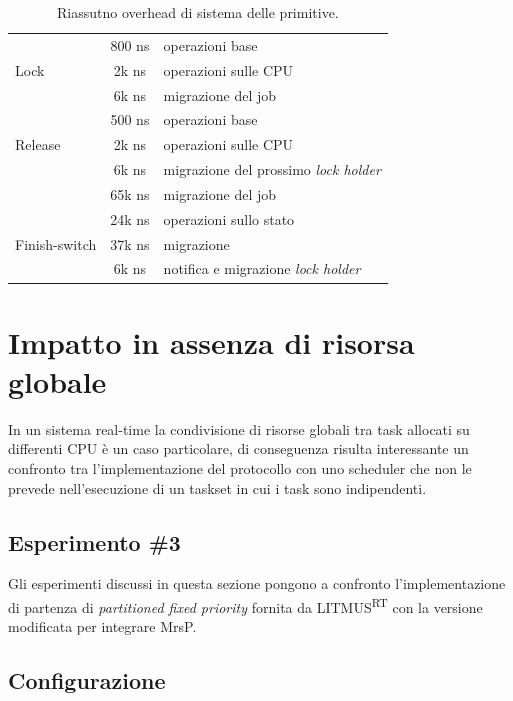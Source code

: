 \begin{table}
  \centering
\begin{tabular}{|l|c|l|}
  \hline
    & 800 ns & operazioni base\\ \cline{2-3}
  Lock & 2k ns & operazioni sulle CPU\\ \cline{2-3}
    & 6k ns & migrazione del job\\
  \hline\hline
    & 500 ns & operazioni base\\ \cline{2-3}
  Release & 2k ns &operazioni sulle CPU\\ \cline{2-3}
    & 6k ns & migrazione del prossimo \textit{lock holder}\\ \cline{2-3}
    & 65k ns & migrazione del job\\
  \hline\hline
    & 24k ns & operazioni sullo stato\\
  Finish-switch & 37k ns & migrazione\\ \cline{2-3}
    & 6k ns & notifica e migrazione \textit{lock holder}\\
  \hline
\end{tabular}
\caption{Riassutno overhead di sistema delle primitive.}
    \label{fig:overheads_riassunto}
\end{table}


\section{Impatto in assenza di risorsa globale}
\label{sec:confronto_norisorsa}

In un sistema real-time la condivisione di risorse globali tra task allocati su differenti CPU è un caso particolare, di conseguenza risulta interessante un confronto tra l'implementazione del protocollo con uno scheduler che non le prevede nell'esecuzione di un taskset in cui i task sono indipendenti.

\subsection{Esperimento \#3}
\label{sec:confronto_norisorsa_exp}

Gli esperimenti discussi in questa sezione pongono a confronto l'implementazione di partenza di \textit{partitioned fixed priority} fornita da LITMUS\textsuperscript{RT} con la versione modificata per integrare MrsP.

\subsection{Configurazione}
\label{sec:confronto_norisorsa_conf}

